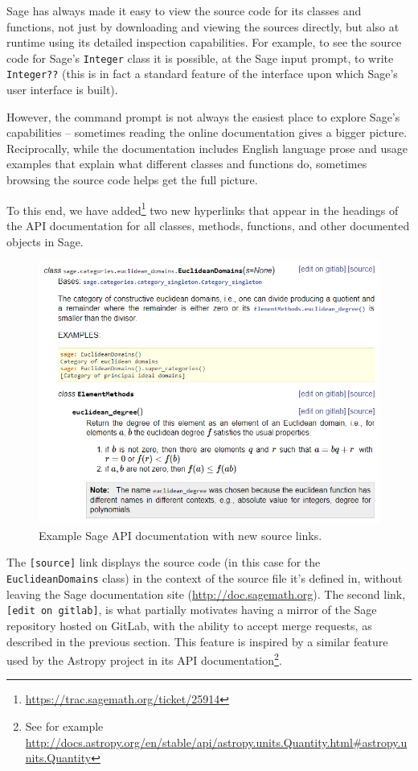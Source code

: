 {Sage has always made it easy to view the source code for its classes and
functions, not just by downloading and viewing the sources directly, but also
at runtime using its detailed inspection capabilities.  For example, to see the
source code for Sage's {\tt Integer} class it is possible, at the Sage input
prompt, to write {\tt Integer??} (this is in fact a standard feature of the
\IPython interface upon which Sage's user interface is built).

However, the command prompt is not always the easiest place to explore Sage's
capabilities -- sometimes reading the online documentation gives a bigger
picture. Reciprocally, while the documentation includes English language prose
and usage examples that explain what different classes and functions do,
sometimes browsing the source code helps get the full picture.

To this end, we have
added\footnote{\url{https://trac.sagemath.org/ticket/25914}} two new hyperlinks
that appear in the headings of the API documentation for all classes, methods,
functions, and other documented objects in Sage.

\begin{figure}[!ht]
    \centering
    \includegraphics[width=\textwidth]{screenshots/source-links}
    \caption{Example Sage API documentation with new source links.}
    \label{fig:source-links}
\end{figure}

The {\tt [source]} link displays the source code (in this case for the {\tt
EuclideanDomains} class) in the context of the source file it's defined in,
without leaving the Sage documentation site (\url{http://doc.sagemath.org}).
The second link, {\tt [edit on gitlab]}, is what partially motivates having a
mirror of the Sage repository hosted on GitLab, with the ability to accept
merge requests, as described in the previous section.  This feature is inspired
by a similar feature used by the Astropy project in its API
documentation\footnote{See for example \url{http://docs.astropy.org/en/stable/api/astropy.units.Quantity.html\#astropy.units.Quantity}}.

}
